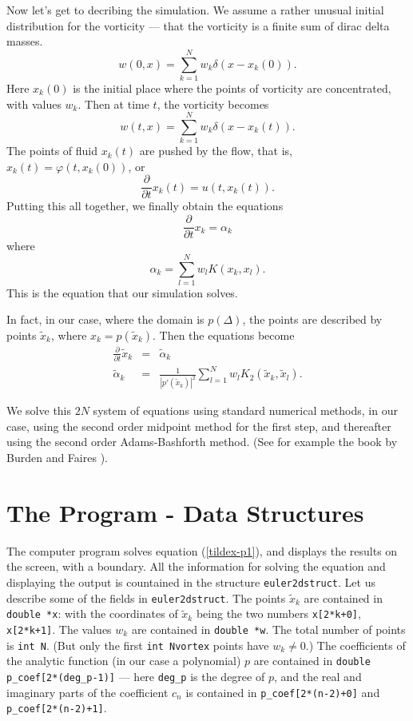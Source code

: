 \documentclass[12pt]{article}
\begin{document}
Now let's get to decribing the simulation.  We assume a rather
unusual initial distribution for the vorticity --- that the
vorticity is a finite sum of dirac delta masses.
\[ w(0,x) = \sum_{k=1}^N w_k \delta(x-x_k(0)) .\]
Here $x_k(0)$ is the initial place where the points
of vorticity are concentrated, with values $w_k$.  
Then at time $t$, the vorticity becomes
\[ w(t,x) = \sum_{k=1}^N w_k \delta(x-x_k(t)) .\]
The points of fluid $x_k(t)$ are pushed by the
flow, that is, $x_k(t) = \varphi(t,x_k(0))$, or
\[ \frac{\partial}{\partial t} x_k(t) = u(t,x_k(t)) .\]
Putting this all together, we finally obtain the equations
\[ \frac{\partial}{\partial t} x_k = \alpha_k \]
where
\[ \alpha_k   = \sum_{l=1}^N w_l K(x_k,x_l) .\]
This is the equation that our simulation solves.

In fact, in our case, where the domain is $p(\Delta)$,
the points are described by points
$\tilde x_k$, where $x_k = p(\tilde x_k)$.  Then
the equations become
\begin{eqnarray}
\label{tildex-p1}
\frac{\partial}{\partial t} \tilde x_k &=& \tilde\alpha_k \\
\label{tildex-p2}
\tilde\alpha_k &=& \frac1{|p'(\tilde x_k)|^2}
     \sum_{l=1}^N w_l K_2(\tilde x_k,\tilde x_l) .
\end{eqnarray}

We solve this $2N$ system of equations using standard
numerical methods, in our case, using the second order midpoint method
for the first step, and thereafter using the second order Adams-Bashforth 
method.  (See for example the book
by Burden and Faires \cite{BF}).

\section{The Program - Data Structures}

The computer program solves equation (\ref{tildex-p1}), and displays
the results on the screen, with a boundary.  All the information
for solving the equation and displaying the output is countained
in the structure {\tt euler2dstruct}.  Let us describe some of
the fields in {\tt euler2dstruct}.  
The points $\tilde x_k$ are contained 
in {\tt double *x}: with the coordinates of
$\tilde x_k$ being the two numbers
{\tt x[2*k+0]}, {\tt x[2*k+1]}.  The values $w_k$ are contained
in {\tt double *w}.  The total number of points is
{\tt int N}.  (But only the first {\tt int Nvortex} points
have $w_k \ne 0$.)  The coefficients of the analytic function
(in our case a polynomial) $p$
are contained in {\tt double p\_coef[2*(deg\_p-1)]} --- here
{\tt deg\_p} is the degree of $p$, and the real and imaginary
parts of the coefficient
$c_n$ is contained in {\tt p\_coef[2*(n-2)+0]} and {\tt p\_coef[2*(n-2)+1]}.
\end{document}
